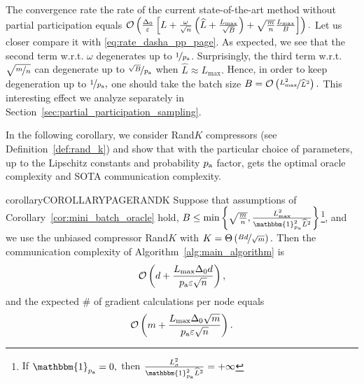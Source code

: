 \documentclass{article}
\newcommand{\algorithmname}{DARIA}
\newcommand*{\probavailable}{\ensuremath{p_{\textnormal{a}}}}
\begin{document}
The convergence rate the rate of the current state-of-the-art method  without partial participation equals
$\mathcal{O}\left(\frac{\Delta_0}{\varepsilon}\left[L + \frac{\omega}{\sqrt{n}}\left(\widehat{L} + \frac{L_{\max}}{\sqrt{B}}\right) + \sqrt{\frac{m}{n}}\frac{L_{\max}}{B}\right]\right).$ Let us closer compare it with \eqref{eq:rate_dasha_pp_page}. As expected, we see that the second term w.r.t. $\omega$ degenerates up to $\nicefrac{1}{\probavailable}$. Surprisingly, the third term w.r.t. $\sqrt{\nicefrac{m}{n}}$ can degenerate up to $\nicefrac{\sqrt{B}}{\probavailable}$ when $\widehat{L} \approx L_{\max}.$ Hence, in order to keep degeneration up to $\nicefrac{1}{\probavailable},$ one should take the batch size $B = \mathcal{O}\left(\nicefrac{L_{\max}^2}{\widehat{L}^2}\right).$ This interesting effect we analyze separately in Section~\ref{sec:partial_participation_sampling}.

In the following corollary, we consider Rand$K$ compressors (see Definition~\ref{def:rand_k}) and show that with the particular choice of parameters, up to the Lipschitz constants and probability $\probavailable$ factor, \algname{\algorithmname-PAGE} gets the optimal oracle complexity and SOTA communication complexity.

\begin{restatable}{corollary}{COROLLARYPAGERANDK}
  Suppose that assumptions of Corollary~\ref{cor:mini_batch_oracle} hold, $B \leq \min\left\{\sqrt{\frac{m}{n}},\frac{L_{\max}^2}{\mathbbm{1}_{\probavailable}^2 \widehat{L}^2}\right\}$\footnote{If $\mathbbm{1}_{\probavailable} = 0,$ then $\frac{L_{\sigma}^2}{\mathbbm{1}_{\probavailable}^2 \widehat{L}^2} = +\infty$}, and we use the unbiased compressor Rand$K$ with $K = \Theta\left(\nicefrac{B d}{\sqrt{m}}\right).$ Then
  the communication complexity of Algorithm~\ref{alg:main_algorithm} is
  \begin{align}
      \label{eq:complexity:mini_batch_oracle:communication}
      \cO\left(d + \frac{L_{\max} \Delta_0 d}{\probavailable \varepsilon \sqrt{n}}\right),
  \end{align}
and the expected \# of gradient calculations per node equals
  \begin{align}
      \label{eq:complexity:mini_batch_oracle}
      \cO\left(m + \frac{L_{\max} \Delta_0 \sqrt{m}}{\probavailable \varepsilon \sqrt{n}} \right).
  \end{align}
\end{restatable}
\end{document}
